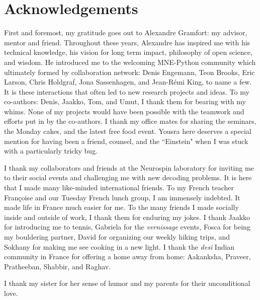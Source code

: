 \chapter*{Acknowledgements}

First and foremost, my gratitude goes out to Alexandre Gramfort: my advisor, mentor and friend. Throughout these years, Alexandre has inspired me with his technical knowledge, his vision for long term impact, philosophy of open science, and wisdom. He introduced me to the welcoming MNE-Python community which ultimately formed by collaboration network: Denis Engemann, Teon Brooks, Eric Larson, Chris Holdgraf, Jona Sassenhagen, and Jean-Rémi King, to name a few. It is these interactions that often led to new research projects and ideas. To my co-authors: Denis, Jaakko, Tom, and Umut, I thank them for bearing with my whims. None of my projects would have been possible with the teamwork and efforts put in by the co-authors. I thank my office mates for sharing the seminars, the Monday cakes, and the latest free food event. Yousra here deserves a special mention for having been a friend, counsel, and the ``Einstein" when I was stuck with a particularly tricky bug.

I thank my collaborators and friends at the Neurospin laboratory for inviting me to their social events and challenging me with new decoding problems. It is here that I made many like-minded international friends. To my French teacher Françoise and our Tuesday French lunch group, I am immensely indebted. It made life in France much easier for me. To the many friends I made socially inside and outside of work, I thank them for enduring my jokes. I thank Jaakko for introducing me to tennis, Gabriela for the \textit{vernissage} events, Fosca for being my bouldering partner, David for organizing our weekly hiking trips, and Sokhany for making me see cooking in a new light. I thank the \textit{desi} Indian community in France for offering a home away from home: Aakanksha, Praveer, Pratheeban, Shabbir, and Raghav.

I thank my sister for her sense of humor and my parents for their unconditional love.



